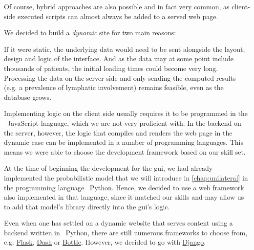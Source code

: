 \documentclass[\relativeRoot/main.tex]{subfiles}
\begin{document}
Of course, hybrid approaches are also possible and in fact very common, as client-side executed scripts can almost always be added to a served web page. 

We decided to build a \emph{dynamic} site for two main reasons: 
\begin{enumerate*}[label={(\arabic*)}]
    \item If it were static, the underlying data would need to be sent alongside the layout, design and logic of the interface. And as the data may at some point include thousands of patients, the initial loading times could become very long. Processing the data on the server side and only sending the computed results (e.g. a prevalence of lymphatic involvement) remains feasible, even as the database grows.
    \item Implementing logic on the client side usually requires it to be programmed in the ~JavaScript language, which we are not very proficient with. In the backend on the server, however, the logic that compiles and renders the web page in the dynamic case can be implemented in a number of programming languages. This means we were able to choose the development framework based on our skill set.
\end{enumerate*}

At the time of beginning the development for the \gls{gui}, we had already implemented the probabilistic model that we will introduce in \cref{chap:unilateral} in the programming language ~Python. Hence, we decided to use a web framework also implemented in that language, since it matched our skills and may allow us to add that model's library directly into the \gls{gui}'s logic.

Even when one has settled on a dynamic website that serves content using a backend written in ~Python, there are still numerous frameworks to choose from, e.g. \href{https://flask.palletsprojects.com/en/2.2.x/}{Flask}, \href{https://plotly.com/dash/}{Dash} or \href{http://bottlepy.org/docs/dev/}{Bottle}. However, we decided to go with \href{https://www.djangoproject.com/}{Django}.
\end{document}
